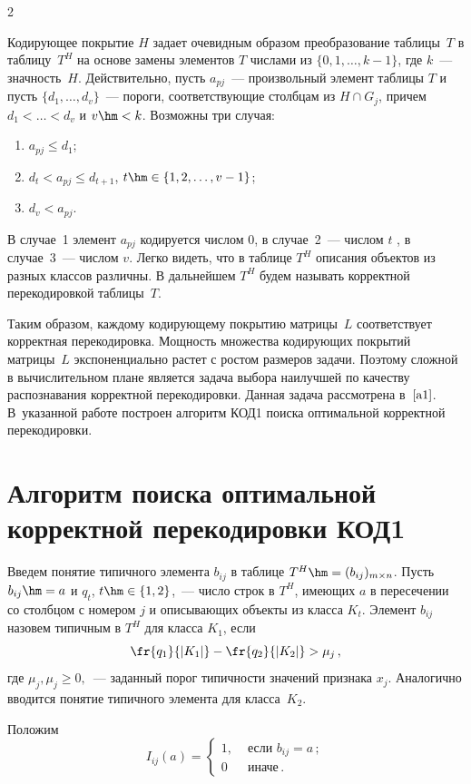 \begin{multicols}{2}
\smallskip

Кодирующее покрытие $H$ задает очевидным образом преобразование
таблицы~$T$ в таблицу~$T^H$ на основе замены элементов $T$ числами
из $\{0,1,\ldots ,k-1\}$, где $k$~--- знач\-ность~$H$. Действительно, пусть
$a_{pj}$~--- произвольный элемент таблицы $T$ и пусть
$\{d_1,\ldots ,d_v\}$~--- пороги, соответствующие столбцам из $H \cap
G_j$, причем $d_1<\ldots <d_v$ и $v\hm<k$. Возможны три случая:
\begin{enumerate}[1)]
\item $a_{pj}\leq d_1$;
\item
    $d_t<a_{pj}\leq d_{t+1}$, $t\hm\in\{1,2,\ldots ,v-1\}$;
\item
    $d_v<a_{pj}$.
    \end{enumerate}

В случае~1 элемент $a_{pj}$ кодируется числом 0, в случае~2~---
числом $t$ , в случае~3~--- числом $v$. Легко видеть, что в таблице
$T^H$ описания объектов из разных классов различны. В дальнейшем
$T^H$ будем называть корректной перекодировкой таблицы~$T$.

Таким образом, каждому кодирующему покрытию матрицы~$L$
соответствует корректная перекодировка. Мощность множества
кодирующих покрытий матрицы~$L$ экспоненциально растет с ростом
размеров задачи. Поэтому сложной в вычислительном плане является
задача выбора наилучшей по качеству распознавания корректной
перекодировки. Данная задача рассмотрена в~$\cite{a1}$. В~указанной
работе построен алгоритм КОД1 поиска оптимальной корректной
перекодировки.

\section{Алгоритм поиска оптимальной корректной перекодировки КОД1}

Введем понятие типичного элемента $b_{ij}$ в таблице $T^H \hm=
(b_{ij})_{m \times n}$. Пусть $b_{ij}\hm=a$ и $q_t$, $t\hm\in \{1,2\}$,~---
число строк в $T^H$, имеющих $a$ в пересечении со столбцом с номером
$j$ и описывающих объекты из класса $K_t$. Элемент $b_{ij}$ назовем
типичным в $T^H$ для класса $K_1$, если
$$
    \fr{q_1}{|K_1|} - \fr{q_2}{|K_2|} > \mu_j\,,
$$
где $\mu_j, \mu_j \geq 0,$~--- заданный порог типичности значений
признака $x_j$. Аналогично вводится понятие типичного элемента для
класса~$K_2$.

Положим
$$
    I_{ij}(a)=
    \begin{cases}
        1, &  \mbox{ если } b_{ij}=a\,;\\
        0 &  \mbox{ иначе}\,.
    \end{cases}
$$


\end{multicols}
